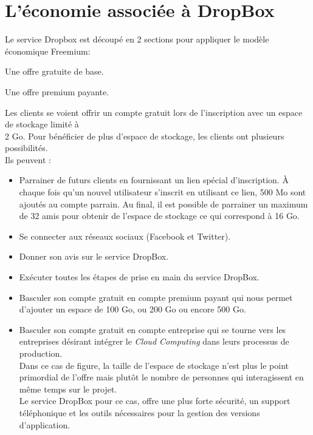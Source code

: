 \documentclass[a4paper, 10pt]{article}
\begin{document}
\section*{L'\'economie associ\'ee \`a DropBox}
Le service Dropbox est d\'ecoup\'e en 2 sections pour appliquer le mod\`ele \'economique Freemium:
\begin{itemize*}
 \item Une offre gratuite de base.
 \item Une offre premium payante.\\
\end{itemize*}
Les clients se voient offrir un compte gratuit lors de l'inscription avec un espace de stockage limit\'e \`a\\2 Go.
Pour b\'en\'eficier de plus d'espace de stockage, les clients ont plusieurs possibilit\'es.\\
Ils peuvent :
\begin{itemize}
 \item Parrainer de futurs clients en fournissant un lien sp\'ecial d'inscription.
\`A chaque fois qu'un nouvel utilisateur s'inscrit en utilisant ce lien, 500 Mo sont ajout\'es au compte parrain.
Au final, il est possible de parrainer un maximum de 32 amis pour obtenir de l'espace de stockage ce qui correspond \`a 16 Go.
 \item Se connecter aux r\'eseaux sociaux (Facebook et Twitter).
 \item Donner son avis sur le service DropBox.
 \item Ex\'ecuter toutes les \'etapes de prise en main du service DropBox.
 \item Basculer son compte gratuit en compte premium payant qui nous permet d'ajouter un espace de 100 Go, ou 200 Go ou encore 500 Go.
 \item Basculer son compte gratuit en compte entreprise qui se tourne vers les entreprises d\'esirant int\'egrer le \textit{Cloud Computing}
dans leurs processus de production.\\
Dans ce cas de figure, la taille de l'espace de stockage n'est plus le point primordial de l'offre mais
plut\^ot le nombre de personnes qui interagissent en m\^eme temps sur le projet.\\
Le service DropBox pour ce cas, offre une plus forte s\'ecurit\'e,
un support t\'el\'ephonique et les outils n\'ecessaires pour la gestion des versions d'application.\\ \\
\end{itemize}
\end{document}
